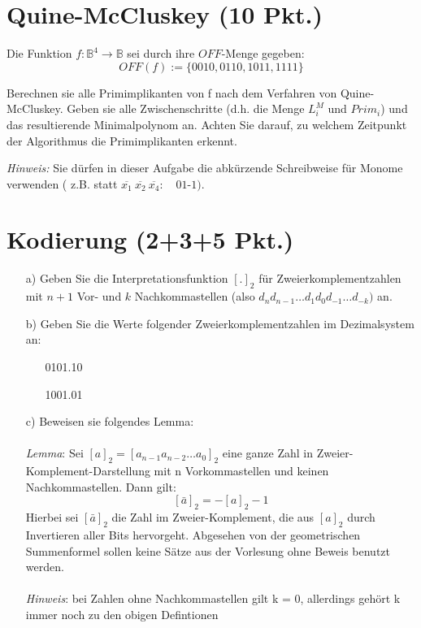 \documentclass{scrartcl}[11pt]
\begin{document}

\section{Quine-McCluskey (10 Pkt.)}

Die Funktion $f: \mathbb{B}^4 \rightarrow \mathbb{B}$ sei durch ihre $OFF$-Menge gegeben:
$$
OFF(f) := \{0010, 0110, 1011, 1111 \}
$$

Berechnen sie alle Primimplikanten von f nach dem Verfahren von Quine-McCluskey. Geben sie
alle Zwischenschritte (d.h. die Menge $L_i^M$ und $Prim_i$) und das resultierende Minimalpolynom an.
Achten Sie darauf, zu welchem Zeitpunkt der Algorithmus die Primimplikanten erkennt.

\emph{Hinweis:} Sie dürfen in dieser Aufgabe die abkürzende Schreibweise für Monome verwenden ( z.B.
statt $\overline{x_1} \ \overline{x_2} \ \overline{x_4}: \quad 01$-$1)$.


\section{Kodierung (2+3+5 Pkt.)}
\begin{itemize}
  \item[a)] Geben Sie die Interpretationsfunktion $[.]_2$ für Zweierkomplementzahlen mit $n+1$ Vor- und $k$
  Nachkommastellen (also $d_n d_{n-1} \ldots d_1 d_0 d_{-1} \ldots d_{-k})$ an.
  \item[b)] Geben Sie die Werte folgender Zweierkomplementzahlen im Dezimalsystem an:
  \begin{itemize}
    \item[] 0101.10
    \item[] 1001.01
  \end{itemize}
  \item[c)] Beweisen sie folgendes Lemma: \\ \\
 \emph{Lemma}: Sei $[a]_2 = \left[a_{n-1}a_{n-2} \ldots a_0 \right]_2$ eine ganze Zahl in Zweier-Komplement-Darstellung mit n
 Vorkommastellen und keinen Nachkommastellen. Dann gilt:
 $$[\bar{a}]_2 = -[a]_2 -1 $$
 Hierbei sei $[\bar{a}]_2$ die Zahl im Zweier-Komplement, die aus $[a]_2$ durch Invertieren aller Bits
 hervorgeht. Abgesehen von der geometrischen Summenformel sollen keine Sätze aus der Vorlesung ohne
 Beweis benutzt werden. \\ \\
 \emph{Hinweis}: bei Zahlen ohne Nachkommastellen gilt k = 0, allerdings gehört k immer noch zu den
 obigen Defintionen

\end{itemize}
\end{document}
